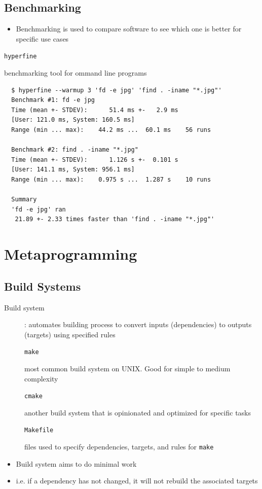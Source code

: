 \documentclass[letterpaper,12pt]{article}
\newcommand*{\lstitem}[1]{
  \setbox0\hbox{\lstinline{#1}}
  \item[\usebox0]
}
\begin{document}
\subsection{Benchmarking}
\begin{itemize}
 \item Benchmarking is used to compare software to see which one is better for specific use cases
\end{itemize}

\begin{description}
 \lstitem{hyperfine} benchmarking tool for ommand line programs
\end{description}

\begin{lstlisting}
  $ hyperfine --warmup 3 'fd -e jpg' 'find . -iname "*.jpg"'
  Benchmark #1: fd -e jpg
  Time (mean +- STDEV):      51.4 ms +-   2.9 ms
  [User: 121.0 ms, System: 160.5 ms]
  Range (min ... max):    44.2 ms ...  60.1 ms    56 runs

  Benchmark #2: find . -iname "*.jpg"
  Time (mean +- STDEV):      1.126 s +-  0.101 s
  [User: 141.1 ms, System: 956.1 ms]
  Range (min ... max):    0.975 s ...  1.287 s    10 runs

  Summary
  'fd -e jpg' ran
   21.89 +- 2.33 times faster than 'find . -iname "*.jpg"'
\end{lstlisting}




\section{Metaprogramming}

\subsection{Build Systems}

\begin{description}
 \item[Build system]: automates building process to convert inputs (dependencies) to outputs (targets) using specified rules
       \lstitem{make} most common build system on UNIX. Good for simple to medium complexity
       \lstitem{cmake} another build system that is opinionated and optimized for specific tasks
       \lstitem{Makefile} files used to specify dependencies, targets, and rules for \lstinline{make}
\end{description}

\begin{itemize}
 \item Build system aims to do minimal work
 \item i.e. if a dependency has not changed, it will not rebuild the associated targets
\end{itemize}
\end{document}

